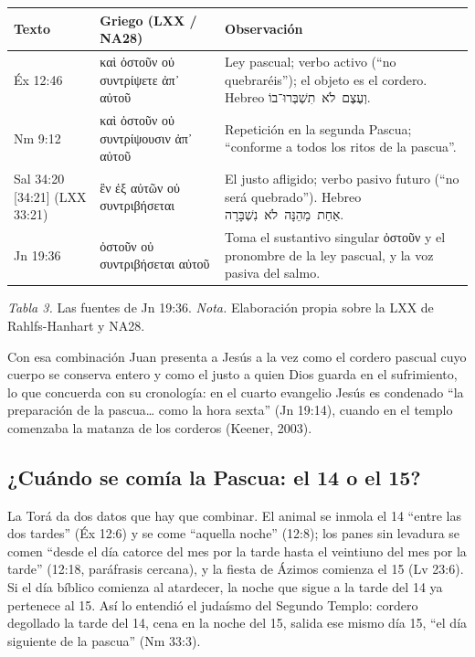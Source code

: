 \documentclass[11pt,letterpaper]{article}
\newcommand{\heb}[1]{\mbox{\foreignlanguage{hebrew}{#1}}}
\newcommand{\grc}[1]{\foreignlanguage{ancientgreek}{#1}}
\begin{document}
\begin{table}[!htbp]\centering\small\renewcommand{\arraystretch}{1.22}
\begin{tabular}{@{}L{2.4cm}L{5.4cm}L{6.6cm}@{}}
\toprule
\textbf{Texto} & \textbf{Griego (LXX / NA28)} & \textbf{Observación} \\ \midrule
Éx 12:46 & \grc{καὶ ὀστοῦν οὐ συντρίψετε ἀπ᾿ αὐτοῦ} & Ley pascual; verbo activo (``no quebraréis''); el objeto es el cordero. Hebreo \heb{וְעֶצֶם לֹא תִשְׁבְּרוּ־בוֹ}. \\
Nm 9:12 & \grc{καὶ ὀστοῦν οὐ συντρίψουσιν ἀπ᾿ αὐτοῦ} & Repetición en la segunda Pascua; ``conforme a todos los ritos de la pascua''. \\
Sal 34:20 [34:21] (LXX 33:21) & \grc{ἓν ἐξ αὐτῶν οὐ συντριβήσεται} & El justo afligido; verbo pasivo futuro (``no será quebrado''). Hebreo \heb{אַחַת מֵהֵנָּה לֹא נִשְׁבָּרָה}. \\
Jn 19:36 & \grc{ὀστοῦν οὐ συντριβήσεται αὐτοῦ} & Toma el sustantivo singular \grc{ὀστοῦν} y el pronombre de la ley pascual, y la voz pasiva del salmo. \\
\bottomrule
\end{tabular}\par
{\footnotesize\color{sepia}\textit{Tabla 3.} Las fuentes de Jn 19:36. \textit{Nota.} Elaboración propia sobre la LXX de Rahlfs-Hanhart y NA28.}
\end{table}

Con esa combinación Juan presenta a Jesús a la vez como el cordero pascual cuyo cuerpo se conserva entero y como el justo a quien Dios guarda en el sufrimiento, lo que concuerda con su cronología: en el cuarto evangelio Jesús es condenado ``la preparación de la pascua\ldots{} como la hora sexta'' (Jn 19:14), cuando en el templo comenzaba la matanza de los corderos (Keener, 2003).

\subsection{¿Cuándo se comía la Pascua: el 14 o el 15?}
La Torá da dos datos que hay que combinar. El animal se inmola el 14 ``entre las dos tardes'' (Éx 12:6) y se come ``aquella noche'' (12:8); los panes sin levadura se comen ``desde el día catorce del mes por la tarde hasta el veintiuno del mes por la tarde'' (12:18, paráfrasis cercana), y la fiesta de Ázimos comienza el 15 (Lv 23:6). Si el día bíblico comienza al atardecer, la noche que sigue a la tarde del 14 ya pertenece al 15. Así lo entendió el judaísmo del Segundo Templo: cordero degollado la tarde del 14, cena en la noche del 15, salida ese mismo día 15, ``el día siguiente de la pascua'' (Nm 33:3).
\end{document}
